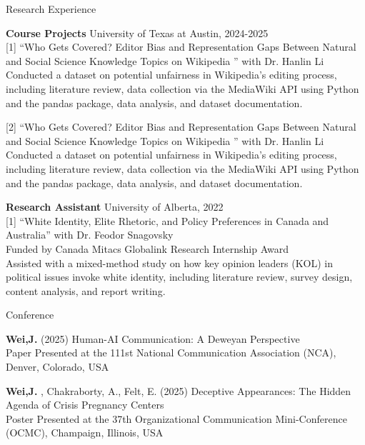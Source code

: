 \documentclass[
	11pt, %
]{resume} %
\begin{document}

\begin{rSection}{Research Experience}

    \textbf{Course Projects} \hfill University of Texas at Austin, 2024-2025\\
    \textnormal{[1]}  “Who Gets Covered? Editor Bias and Representation Gaps Between Natural and Social Science Knowledge Topics on Wikipedia ” with Dr. Hanlin Li\\
\textbullet\enspace Conducted a dataset on potential unfairness in Wikipedia's editing process, including literature review, data collection via the MediaWiki API using Python and the pandas package, data analysis, and dataset documentation.

    \textnormal{[2]}  “Who Gets Covered? Editor Bias and Representation Gaps Between Natural and Social Science Knowledge Topics on Wikipedia ” with Dr. Hanlin Li\\
\textbullet\enspace Conducted a dataset on potential unfairness in Wikipedia's editing process, including literature review, data collection via the MediaWiki API using Python and the pandas package, data analysis, and dataset documentation.


    \textbf{Research Assistant} \hfill University of Alberta, 2022\\
    \textnormal{[1]}  “White Identity, Elite Rhetoric, and Policy Preferences in Canada and Australia” with Dr. Feodor Snagovsky\\
\textbullet\enspace Funded by Canada Mitacs Globalink Research Internship Award\\
\textbullet\enspace Assisted with a mixed-method study on how key opinion leaders (KOL) in political issues invoke white identity, including literature review, survey design, content analysis, and report writing.


	
\end{rSection}



\begin{rSection}{Conference}

    
	\textbf{Wei,J.} (2025) Human-AI Communication: A Deweyan Perspective\\
\textbullet\enspace Paper Presented at the 111st National Communication Association (NCA), Denver, Colorado, USA

	\textbf{Wei,J.} , Chakraborty, A., Felt, E. (2025) Deceptive Appearances: The Hidden Agenda of Crisis Pregnancy Centers \\
\textbullet\enspace Poster Presented at the 37th Organizational Communication Mini-Conference (OCMC), Champaign, Illinois, USA
	
\end{rSection}
\end{document}
